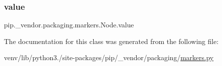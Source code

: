\subsubsection{\texorpdfstring{value}{value}}
{\footnotesize\ttfamily pip.\+\_\+vendor.\+packaging.\+markers.\+Node.\+value}



The documentation for this class was generated from the following file\+:\begin{DoxyCompactItemize}
\item 
venv/lib/python3./site-\/packages/pip/\+\_\+vendor/packaging/\hyperlink{pip_2__vendor_2packaging_2markers_8py}{markers.\+py}\end{DoxyCompactItemize}
